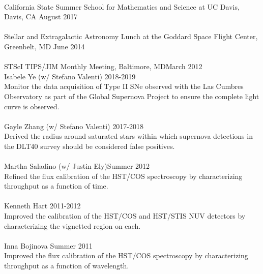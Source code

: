 \documentclass[10pt]{cv}
\begin{document}
\begin{llist}
\\
California State Summer School for Mathematics and Science at UC Davis, Davis, CA \hfill August 2017\\ \vspace{-0.1in}  %
\\
Stellar and Extragalactic Astronomy Lunch at the Goddard Space Flight Center, Greenbelt, MD \hfill June 2014\\  \vspace{-0.1in}  %
\\
STScI TIPS/JIM Monthly Meeting, Baltimore, MD\hfill March 2012\\\vspace{-0.1in}  
\newpage
\vspace{-0.1in}  
Isabele Ye (w/ Stefano Valenti) \hfill 2018-2019\\
Monitor the data acquisition of Type II SNe observed with the Las Cumbres Observatory as part of the Global Supernova Project to ensure the complete light curve is observed.\\
\\
Gayle Zhang (w/ Stefano Valenti) \hfill 2017-2018\\
Derived the radius around saturated stars within which supernova detections in the DLT40 survey should be considered false positives.\\
\\
Martha Saladino (w/ Justin Ely)\hfill Summer 2012\\
Refined the flux calibration of the HST/COS spectroscopy by characterizing throughput as a function of time.\\
\\
Kenneth Hart \hfill 2011-2012\\
Improved the calibration of the HST/COS and HST/STIS NUV detectors by characterizing the vignetted region on each.\\
\\
Inna Bojinova \hfill Summer 2011\\
Improved the flux calibration of the HST/COS spectroscopy by characterizing throughput as a function of wavelength.\\

\end{llist}
\end{document}
